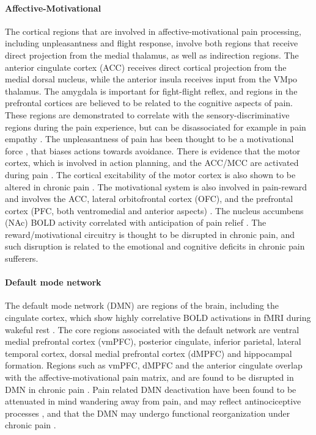 \paragraph{Affective-Motivational}
The cortical regions that are involved in affective-motivational pain processing, including unpleasantness and flight response, involve both regions that receive direct projection from the medial thalamus, as well as indirection regions. The anterior cingulate cortex (ACC) receives direct cortical projection from the medial dorsal nucleus, while the anterior insula receives input from the VMpo thalamus. The amygdala is important for fight-flight reflex, and regions in the prefrontal cortices are believed to be related to the cognitive aspects of pain. These regions are demonstrated to correlate with the sensory-discriminative regions during the pain experience, but can be disassociated for example in pain empathy \cite{Singer2004}. The unpleasantness of pain has been thought to be a motivational force \cite{Auvray2010}, that biases actions towards avoidance. There is evidence that the motor cortex, which is involved in action planning, and the ACC/MCC are activated during pain \cite{Parker2016,Burns2016,Erpelding2013}. The cortical excitability of the motor cortex is also shown to be altered in chronic pain \cite{Parker2016}. The motivational system is also involved in pain-reward and involves the ACC, lateral orbitofrontal cortex (OFC), and the prefrontal cortex (PFC, both ventromedial and anterior aspects) \cite{Navratilova2015}. The nucleus accumbens (NAc) BOLD activity correlated with anticipation of pain relief \cite{Baliki2010}. The reward/motivational circuitry is thought to be disrupted in chronic pain, and such disruption is related to the emotional and cognitive deficits in chronic pain sufferers.

\paragraph{Default mode network}
The default mode network (DMN) are regions of the brain, including the cingulate cortex, which show highly correlative BOLD activations in fMRI during wakeful rest \cite{Greicius2003,Raichle2015}. The core regions associated with the default network are ventral medial prefrontal cortex (vmPFC), posterior cingulate, inferior parietal, lateral temporal cortex, dorsal medial prefrontal cortex (dMPFC) and hippocampal formation. Regions such as vmPFC, dMPFC and the anterior cingulate overlap with the affective-motivational pain matrix, and are found to be disrupted in DMN in chronic pain \cite{Baliki2008}. Pain related DMN deactivation have been found to be attenuated  in mind wandering away from pain, and may reflect antinociceptive processes \cite{Kucyi2013}, and that the DMN may undergo functional reorganization under chronic pain \cite{Baliki2014}. 

